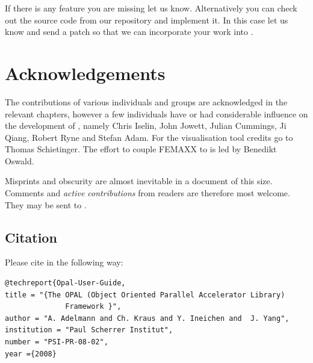 If there is any feature you are missing let us know. Alternatively you can check out the source code from our repository and implement it. In this case let us know and send a patch so that we can incorporate your work into \opal.
\clearpage
\section{Acknowledgements}
The contributions of various individuals and groups are acknowledged in the relevant chapters, however a few individuals have or had considerable influence on the 
development of \opal, namely Chris Iselin, John Jowett, Julian Cummings, Ji Qiang, Robert Ryne and Stefan Adam. For the \partroot visualisation tool credits go to Thomas Schietinger.
The effort to couple FEMAXX to \opal is led by Benedikt Oswald. 

Misprints and obscurity are almost inevitable in a document of this size.
Comments and {\em active contributions}  from readers are therefore most welcome.
They may be sent to .


\subsection{Citation}
Please cite \opal in the following way:
\begin{small}
\begin{verbatim} 
@techreport{Opal-User-Guide,
title = "{The OPAL (Object Oriented Parallel Accelerator Library) 
              Framework }",
author = "A. Adelmann and Ch. Kraus and Y. Ineichen and  J. Yang",
institution = "Paul Scherrer Institut",
number = "PSI-PR-08-02",
year ={2008}
\end{verbatim}
\end{small}




